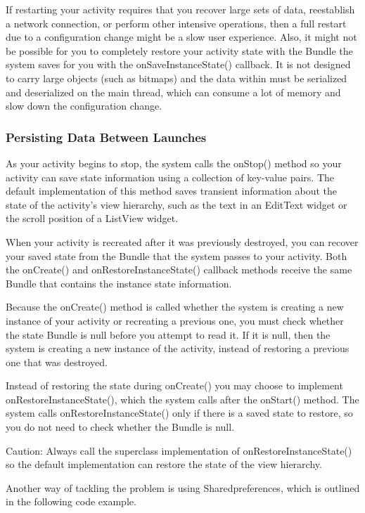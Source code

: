 If restarting your activity requires that you recover large sets of data, reestablish a network connection, or perform other intensive operations, then a full restart due to a configuration change might be a slow user experience.
Also, it might not be possible for you to completely restore your activity state with the Bundle the system saves for you with the onSaveInstanceState() callback.
It is not designed to carry large objects (such as bitmaps) and the data within must be serialized and deserialized on the main thread, which can consume a lot of memory and slow down the configuration change.

\subsubsection{Persisting Data Between Launches}
As your activity begins to stop, the system calls the onStop() method so your activity can save state information using a collection of key-value pairs.
The default implementation of this method saves transient information about the state of the activity's view hierarchy, such as the text in an EditText widget or the scroll position of a ListView widget.

When your activity is recreated after it was previously destroyed, you can recover your saved state from the Bundle that the system passes to your activity.
Both the onCreate() and onRestoreInstanceState() callback methods receive the same Bundle that contains the instance state information.

Because the onCreate() method is called whether the system is creating a new instance of your activity or recreating a previous one, you must check whether the state Bundle is null before you attempt to read it.
If it is null, then the system is creating a new instance of the activity, instead of restoring a previous one that was destroyed.

Instead of restoring the state during onCreate() you may choose to implement onRestoreInstanceState(), which the system calls after the onStart() method.
The system calls onRestoreInstanceState() only if there is a saved state to restore, so you do not need to check whether the Bundle is null.

Caution: Always call the superclass implementation of onRestoreInstanceState() so the default implementation can restore the state of the view hierarchy.

Another way of tackling the problem is using Sharedpreferences, which is outlined in the following code example.

